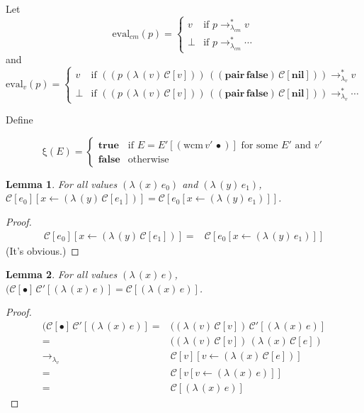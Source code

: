 \documentclass[ms,electronic,twosidetoc,letterpaper,chaptercenter,parttop]{byumsphd}
\begin{document}
Let
\[
\mathrm{eval}_{cm}(p)=\begin{cases}
v     &\text{if $p\rightarrow_{\lambda_{cm}}^{*}v$}\\
\perp &\text{if $p\rightarrow_{\lambda_{cm}}^{*}\cdots$}
\end{cases}
\]
and
\[
\mathrm{eval}_{v}(p)=\begin{cases}
v     &\text{if $((p\,(\lambda\,(v)\,\mathcal{C}[v]))\,((\mathbf{pair}\,\mathbf{false})\,\mathcal{C}[\mathbf{nil}]))\rightarrow_{\lambda_v}^{*}v$}\\
\perp &\text{if $((p\,(\lambda\,(v)\,\mathcal{C}[v]))\,((\mathbf{pair}\,\mathbf{false})\,\mathcal{C}[\mathbf{nil}]))\rightarrow_{\lambda_v}^{*}\cdots$}
\end{cases}
\]

\newtheorem{lemma}{Lemma}
\newtheorem{theorem}{Theorem}
\newtheorem{case}{Case}

Define

\[
\mathrm{\xi}(E)=\begin{cases}
\mathbf{true} &\text{if $E=E'[(\mathrm{wcm}\,v'\,\bullet)]$ for some $E'$ and $v'$}\\
\mathbf{false} &\text{otherwise}
\end{cases}
\]

\begin{lemma}
\label{collapse}
For all values $(\lambda\,(x)\,e_0)$ and $(\lambda\,(y)\,e_1)$, $\mathcal{C}[e_0][x\leftarrow (\lambda\,(y)\,\mathcal{C}[e_1])]=\mathcal{C}[e_0[x\leftarrow (\lambda\,(y)\,e_1)]]$.
\end{lemma}

\begin{proof}
\begin{align*}
\mathcal{C}[e_0][x\leftarrow (\lambda\,(y)\,\mathcal{C}[e_1])] = &\mathcal{C}[e_0[x\leftarrow (\lambda\,(y)\,e_1)]]
\end{align*}
(It's obvious.)
\end{proof}

\begin{lemma}
\label{hole-context-to-value}
For all values $(\lambda\,(x)\,e)$, $(\mathcal{C}[\bullet]\,\mathcal{C}'[(\lambda\,(x)\,e)]=\mathcal{C}[(\lambda\,(x)\,e)]$.
\end{lemma}

\begin{proof}
\begin{align*}
(\mathcal{C}[\bullet]\,\mathcal{C}'[(\lambda\,(x)\,e)] = &((\lambda\,(v)\,\mathcal{C}[v])\,\mathcal{C}'[(\lambda\,(x)\,e)]\\
                                                       = &((\lambda\,(v)\,\mathcal{C}[v])\,(\lambda\,(x)\,\mathcal{C}[e])\\
                                 \rightarrow_{\lambda_v} &\mathcal{C}[v][v\leftarrow (\lambda\,(x)\,\mathcal{C}[e])]\\
                                                       = &\mathcal{C}[v[v\leftarrow (\lambda\,(x)\,e)]]\\
                                                       = &\mathcal{C}[(\lambda\,(x)\,e)]
\end{align*}
\end{proof}
\end{document}
